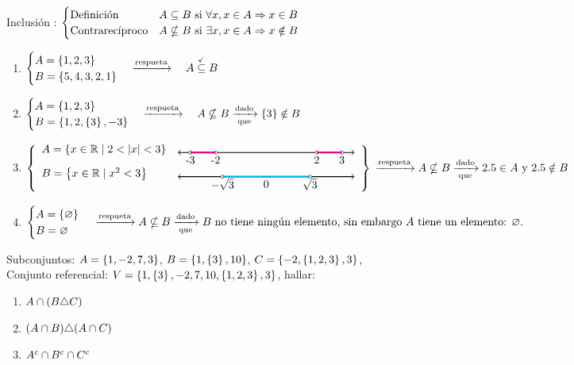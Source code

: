 \documentclass[12pt,a4paper, spanish]{article}
\begin{document}
\ejercicio
Inclusión :
$
	\begin{cases}
		\text{Definición}      & A \subseteq B \text{ si } \forall x, x \in A \Rightarrow x \in B   \\
		\text{Contrarecíproco} & A \nsubseteq B \text{ si } \exists x, x \in A \Rightarrow x \notin B
	\end{cases}
$
\begin{enumerate}[label=(\roman*)]
	\item $\begin{cases}
			      A = \set{1, 2, 3} \\
			      B = \set{5,4,3,2,1}
		      \end{cases}
		      \flecha{respueta} \quad
		      A \stacktext{\checkmark}{\subseteq} B$
	\item $\begin{cases}
			      A = \set{1, 2, 3} \\
			      B = \set{1,2,\set{3},-3}
		      \end{cases}
		      \flecha{respueta} \quad
		      A \nsubseteq B \flecha{dado}[que] \set{3} \notin B$
	\item $
		      \llaves{ll}{
			      A = \set{x \en \reales \talque 2<|x|<3} & \tresiiiUno \\
			      B = \set{x \en \reales \talque x^2 < 3 } & \tresiiiDos
		      }\\
		      \flecha{respueta} A \nsubseteq B \flecha{dado}[que] 2.5 \en A \text{ y } 2.5 \notin B
	      $
	\item$
		      \begin{cases}
			      A = \set{\vacio} \\
			      B = \vacio
		      \end{cases}\\
		      \flecha{respueta}
		      A \nsubseteq B \flecha{dado}[que] \text{$B$ no tiene ningún elemento, sin embargo $A$ tiene un elemento: $\vacio$.}
	      $
\end{enumerate}

\ejercicio
Subconjuntos: $A = \left\{ 1, -2, 7, 3 \right\}$, $B = \left\{ 1, \left\{ 3 \right\}, 10 \right\}$, $C = \left\{ -2,\left\{ 1,2,3 \right\},3 \right\}$,\\
Conjunto referencial: $V = \left\{ 1,\left\{ 3 \right\}, -2,7, 10, \left\{ 1,2,3 \right\},3 \right\}$, hallar:

\begin{multicols}{2}
	\begin{enumerate}[label=(\roman*)]
		\item $A \cap (B \triangle C)$
		\item $(A \cap B) \triangle (A \cap C)$
		\item $A^c \cap B^c \cap C^c$
	\end{enumerate}
\end{multicols}
\end{document}
